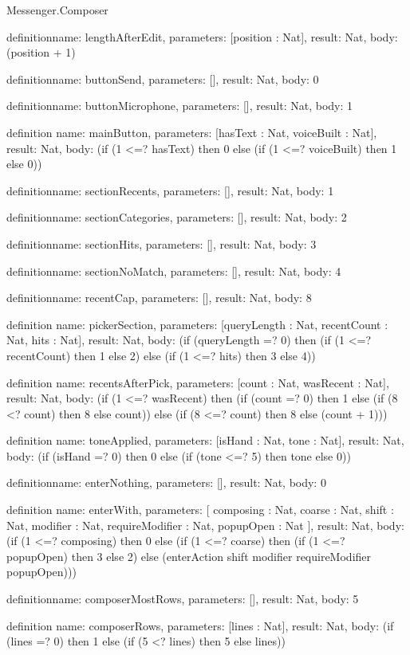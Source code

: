 \begin{lexlean}{Messenger.Composer}
\begin{semanticmodule}
definition{name: lengthAfterEdit, parameters: [position : Nat], result: Nat, body: (position + 1)}

definition{name: buttonSend, parameters: [], result: Nat, body: 0}

definition{name: buttonMicrophone, parameters: [], result: Nat, body: 1}

definition{
  name: mainButton,
  parameters: [hasText : Nat, voiceBuilt : Nat],
  result: Nat,
  body: (if (1 <=? hasText) then 0 else (if (1 <=? voiceBuilt) then 1 else 0))
}

definition{name: sectionRecents, parameters: [], result: Nat, body: 1}

definition{name: sectionCategories, parameters: [], result: Nat, body: 2}

definition{name: sectionHits, parameters: [], result: Nat, body: 3}

definition{name: sectionNoMatch, parameters: [], result: Nat, body: 4}

definition{name: recentCap, parameters: [], result: Nat, body: 8}

definition{
  name: pickerSection,
  parameters: [queryLength : Nat, recentCount : Nat, hits : Nat],
  result: Nat,
  body: (if (queryLength =? 0) then (if (1 <=? recentCount) then 1 else 2) else (if (1 <=? hits) then 3 else 4))
}

definition{
  name: recentsAfterPick,
  parameters: [count : Nat, wasRecent : Nat],
  result: Nat,
  body: (if (1 <=? wasRecent) then (if (count =? 0) then 1 else (if (8 <? count) then 8 else count)) else (if (8 <=? count) then 8 else (count + 1)))
}

definition{
  name: toneApplied,
  parameters: [isHand : Nat, tone : Nat],
  result: Nat,
  body: (if (isHand =? 0) then 0 else (if (tone <=? 5) then tone else 0))
}

definition{name: enterNothing, parameters: [], result: Nat, body: 0}

definition{
  name: enterWith,
  parameters: [
    composing : Nat,
    coarse : Nat,
    shift : Nat,
    modifier : Nat,
    requireModifier : Nat,
    popupOpen : Nat
  ],
  result: Nat,
  body: (if (1 <=? composing) then 0 else (if (1 <=? coarse) then (if (1 <=? popupOpen) then 3 else 2) else (enterAction shift modifier requireModifier popupOpen)))
}

definition{name: composerMostRows, parameters: [], result: Nat, body: 5}

definition{
  name: composerRows,
  parameters: [lines : Nat],
  result: Nat,
  body: (if (lines =? 0) then 1 else (if (5 <? lines) then 5 else lines))
}


\end{semanticmodule}
\end{lexlean}
